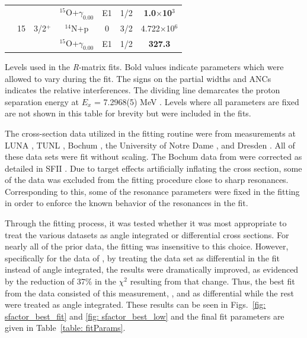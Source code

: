 \begin{table}[]
\begin{center}
\begin{threeparttable}
\begin{tabular}{c  c  c  c  c  c  c}
	&	&	&	$^{15}$O+$\gamma_{0.00}$	&	E1	&	1/2	&	\textbf{1.0$\times$10$^{3}$}	\\
& {15}	&	3/2$^+$	&	$^{14}$N+p	&	0	&	3/2	&	{4.722$\times$10$^6$}\\
	&	&	&	$^{15}$O+$\gamma_{0.00}$	&	E1	&	1/2	&	\textbf{327.3}	\\
\bottomrule
\end{tabular}
\begin{tablenotes}
\small 
\item Levels used in the \textit{R}-matrix fits. Bold values indicate parameters which were allowed to vary during the fit. The signs on the partial widths and ANCs indicates the relative interferences. The dividing line demarcates the proton separation energy at $E_x$ = 7.2968(5) MeV \cite{Ajzenberg-Selove1991}. Levels where all parameters are fixed are not shown in this table for brevity but were included in the fits.
\end{tablenotes}
\end{threeparttable}
\label{table: fitParamsFullFit}
\end{center}
\end{table}  


The cross-section data utilized in the fitting routine were from measurements at LUNA \cite{Formicola2004, Imbriani2005, Marta2008, Marta2011}, TUNL \cite{Runkle2005}, Bochum \cite{Schroder1987}, the University of Notre Dame \cite{Li2016}, and Dresden \cite{Wagner2018}. All of these data sets were fit without scaling. The Bochum data from \citet{Schroder1987} were corrected as detailed in SFII \cite{Adelberger2011}. Due to target effects artificially inflating the cross section, some of the data was excluded from the fitting procedure close to sharp resonances. Corresponding to this, some of the resonance parameters were fixed in the fitting in order to enforce the known behavior of the resonances in the fit. 

Through the fitting process, it was tested whether it was most appropriate to treat the various datasets as angle integrated or differential cross sections. For nearly all of the prior data, the fitting was insensitive to this choice. However, specifically for the data of \citet{Schroder1987}, by treating the data set as differential in the fit instead of angle integrated, the results were dramatically improved, as evidenced by the reduction of 37$\%$ in the $\chi^{2}$ resulting from that change. Thus, the best fit from the data consisted of this measurement, \citet{Schroder1987}, and \citet{Li2016} as differential while the rest were treated as angle integrated. These results can be seen in Figs.~\ref{fig: sfactor_best_fit} and \ref{fig: sfactor_best_low} and the final fit parameters are given in Table~\ref{table: fitParams}. 

